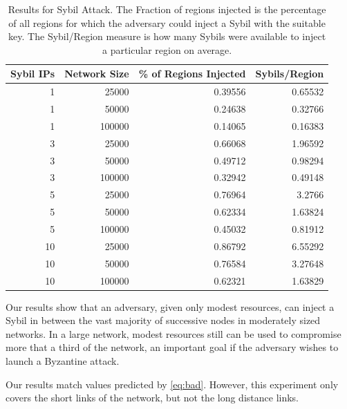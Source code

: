 \documentclass[a4paper]{article}
\begin{document}
\begin{table}[h]\small

\begin{center}
       
\begin{tabular}{|r|r|r|r|}
    \hline
    Sybil IPs & Network Size & \% of Regions Injected & Sybils/Region \\ \hline
    1 & 25000 & 0.39556 & 0.65532 \\ \hline
    1 & 50000 & 0.24638 & 0.32766 \\ \hline
    1 & 100000 & 0.14065 & 0.16383 \\ \hline
    3 & 25000 & 0.66068 & 1.96592 \\ \hline
    3 & 50000 & 0.49712 & 0.98294 \\ \hline
    3 & 100000 & 0.32942 & 0.49148 \\ \hline
    5 & 25000 & 0.76964 & 3.2766 \\ \hline
    5 & 50000 & 0.62334 & 1.63824 \\ \hline
    5 & 100000 & 0.45032 & 0.81912 \\ \hline
    10 & 25000 & 0.86792 & 6.55292 \\ \hline
    10 & 50000 & 0.76584 & 3.27648 \\ \hline
    10 & 100000 & 0.62321 & 1.63829 \\ \hline
\end{tabular}
\label{tab:exp2}
\caption{Results for Sybil Attack.  The Fraction of regions injected is the percentage of all regions for which the adversary could inject a Sybil with the suitable key. The Sybil/Region measure is how many Sybils were available to inject a particular region on average.}
\end{center}

\end{table}

Our results show that an adversary, given only modest resources, can inject a Sybil in between the vast majority of successive nodes in moderately sized networks.
In a large network, modest resources still can be used to compromise more that a third of the network, an  important goal if the adversary  wishes to launch a Byzantine attack.

Our results match values predicted by \ref{eq:bad}.
However, this experiment only covers the short links of the network, but not the long distance links.
\end{document}
